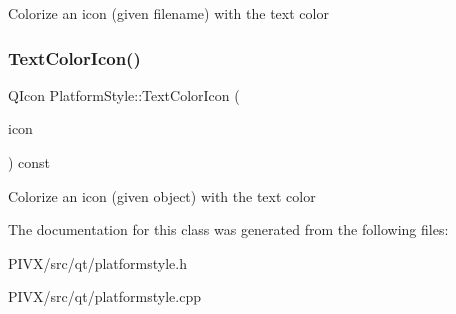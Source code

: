 Colorize an icon (given filename) with the text color \mbox{\label{class_platform_style_adf1b4129d4d6ccff590d202b95718892}} 
\subsubsection{\texorpdfstring{Text\+Color\+Icon()}{TextColorIcon()}\hspace{0.1cm}{\footnotesize\ttfamily [2/2]}}
{\footnotesize\ttfamily Q\+Icon Platform\+Style\+::\+Text\+Color\+Icon (\begin{DoxyParamCaption}\item[{const Q\+Icon \&}]{icon }\end{DoxyParamCaption}) const}

Colorize an icon (given object) with the text color 

The documentation for this class was generated from the following files\+:\begin{DoxyCompactItemize}
\item 
P\+I\+V\+X/src/qt/platformstyle.\+h\item 
P\+I\+V\+X/src/qt/platformstyle.\+cpp\end{DoxyCompactItemize}
